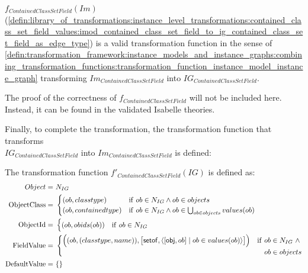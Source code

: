 \begin{thm}
\label{defin:library_of_transformations:instance_level_transformations:contained_class_set_field_values:imod_contained_class_set_field_to_ig_contained_class_set_field_as_edge_type_func}
$f_{ContainedClassSetField}(Im)$ (\cref{defin:library_of_transformations:instance_level_transformations:contained_class_set_field_values:imod_contained_class_set_field_to_ig_contained_class_set_field_as_edge_type}) is a valid transformation function in the sense of \cref{defin:transformation_framework:instance_models_and_instance_graphs:combining_transformation_functions:transformation_function_instance_model_instance_graph} transforming $Im_{ContainedClassSetField}$ into $IG_{ContainedClassSetField}$.
\end{thm}

The proof of the correctness of $f_{ContainedClassSetField}$ will not be included here. Instead, it can be found in the validated Isabelle theories.

Finally, to complete the transformation, the transformation function that transforms \\$IG_{ContainedClassSetField}$ into $Im_{ContainedClassSetField}$ is defined:

\begin{defin}
\label{defin:library_of_transformations:instance_level_transformations:contained_class_set_field_values:ig_contained_class_set_field_as_edge_type_to_imod_contained_class_set_field}
The transformation function $f'_{ContainedClassSetField}(IG)$ is defined as:
\begin{align*}
Object =\ &N_{IG} \\
\mathrm{ObjectClass} =\ & \begin{cases}
    (ob, classtype) & \mathrm{if }\ ob \in N_{IG} \land ob \in objects\\
    (ob, containedtype) & \mathrm{if }\ ob \in N_{IG} \land ob \in \bigcup_{ob \in objects} values(ob)
\end{cases}\\
\mathrm{ObjectId} =\ & \begin{cases}
    (ob, obids(ob)) & \mathrm{if }\ ob \in N_{IG}
\end{cases}\\
\mathrm{FieldValue} =\ & \begin{cases}
    \Big((ob, (classtype, name)), \big[\mathsf{setof}, \langle [\mathsf{obj}, ob] \mid ob \in values(ob) \rangle\big]\Big) & \mathrm{if }\ ob \in N_{IG}\ \land\\&\quad ob \in objects
\end{cases} \\
\mathrm{DefaultValue} =\ & \{\}
\end{align*}
\end{defin}

